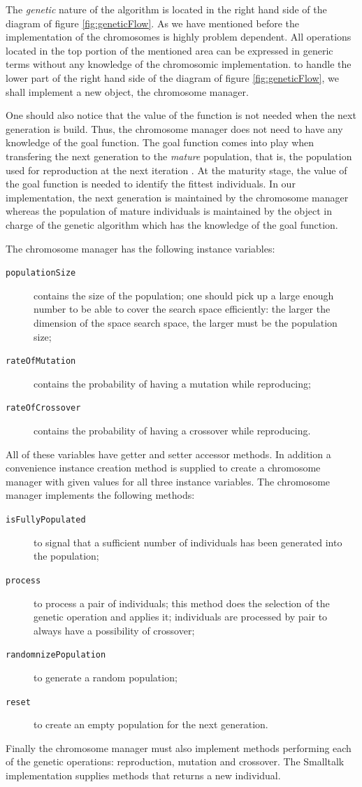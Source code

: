 \documentclass[twoside]{book}
\begin{document}
The {\sl genetic} nature of the algorithm is located in the right
hand side of the diagram of figure \ref{fig:geneticFlow}. As we
have mentioned before the implementation of the chromosomes is
highly problem dependent. All operations located in the top
portion of the mentioned area can be expressed in generic terms
without any knowledge of the chromosomic implementation. to handle
the lower part of the right hand side of the diagram of figure
\ref{fig:geneticFlow}, we shall implement a new object, the
chromosome manager.

One should also notice that the value of the function is not
needed when the next generation is build. Thus, the chromosome
manager does not need to have any knowledge of the goal function.
The goal function comes into play when transfering the next
generation to the {\sl mature} population, that is, the population
used for reproduction at the next iteration . At the maturity
stage, the value of the goal function is needed to identify the
fittest individuals. In our implementation, the next generation is
maintained by the chromosome manager whereas the population of
mature individuals is maintained by the object in charge of the
genetic algorithm which has the knowledge of the goal function.

\noindent The chromosome manager has the following instance
variables:
\begin{description}
  \item[\tt populationSize] contains the size of the population;
  one should pick up a large enough number to be able to cover the
  search space efficiently: the larger the dimension of the space
  search space, the larger must be the population size;
  \item[\tt rateOfMutation] contains the probability of having a
  mutation while reproducing;
  \item[\tt rateOfCrossover] contains the probability of having a
  crossover while reproducing.
\end{description}
All of these variables have getter and setter accessor methods. In
addition a convenience instance creation method is supplied to
create a chromosome manager with given values for all three
instance variables. The chromosome manager implements the
following methods:
\begin{description}
  \item[\tt isFullyPopulated] to signal that a sufficient number of individuals
  has been generated into the population;
  \item[\tt process] to process a pair of individuals; this method
  does the selection of the genetic operation and applies it;
  individuals are processed by pair to always have a possibility
  of crossover;
  \item[\tt randomnizePopulation] to generate a random population;
  \item[\tt reset] to create an empty population for the next
  generation.
\end{description}
Finally the chromosome manager must also implement methods
performing each of the genetic operations: reproduction, mutation
and crossover. The Smalltalk implementation supplies methods that
returns a new individual.
\end{document}
